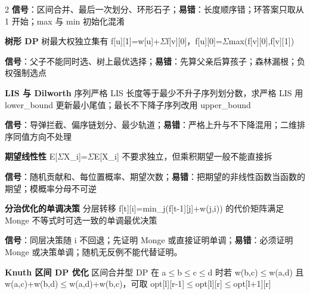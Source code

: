 \documentclass[UTF8,fontset=fandol,a4paper,twoside]{ctexart}
\begin{document}
\begin{multicols}{2}
\textbf{信号}：区间合并、最后一次划分、环形石子；\textbf{易错}：长度顺序错；环答案只取从 1 开始；max 与 min 初始化混淆\par
\par\textbf{树形 DP}\quad
树最大权独立集有 f[\allowbreak{}u]\allowbreak{}[\allowbreak{}1]\allowbreak{}=\allowbreak{}w[\allowbreak{}u]\allowbreak{}+\allowbreak{}\ensuremath{\Sigma}f[\allowbreak{}v]\allowbreak{}[\allowbreak{}0]\allowbreak{}，f[\allowbreak{}u]\allowbreak{}[\allowbreak{}0]\allowbreak{}=\allowbreak{}\ensuremath{\Sigma}max(\allowbreak{}f[\allowbreak{}v]\allowbreak{}[\allowbreak{}0]\allowbreak{},\allowbreak{}f[\allowbreak{}v]\allowbreak{}[\allowbreak{}1]\allowbreak{})\allowbreak{}\par
\textbf{信号}：父子不能同时选、树上最优选择；\textbf{易错}：先算父亲后算孩子；森林漏根；负权强制选点\par
\par\textbf{LIS 与 Dilworth}\quad
序列严格 LIS 长度等于最少不升子序列划分数，求严格 LIS 用 lower\_bound 更新最小尾值；最长不下降子序列改用 upper\_bound\par
\textbf{信号}：导弹拦截、偏序链划分、最少轨道；\textbf{易错}：严格上升与不下降混用；二维排序同值方向不处理\par
\par\textbf{期望线性性}\quad
E[\allowbreak{}\ensuremath{\Sigma}X\_i]\allowbreak{}=\allowbreak{}\ensuremath{\Sigma}E[\allowbreak{}X\_i]\allowbreak{} 不要求独立，但乘积期望一般不能直接拆\par
\textbf{信号}：随机贡献和、每位置概率、期望次数；\textbf{易错}：把期望的非线性函数当函数的期望；模概率分母不可逆\par
\par\textbf{分治优化的单调决策}\quad
分层转移 f[\allowbreak{}t]\allowbreak{}[\allowbreak{}i]\allowbreak{}=\allowbreak{}min\_j(\allowbreak{}f[\allowbreak{}t-\allowbreak{}1]\allowbreak{}[\allowbreak{}j]\allowbreak{}+\allowbreak{}w(\allowbreak{}j,\allowbreak{}i)\allowbreak{})\allowbreak{} 的代价矩阵满足 Monge 不等式时可选一致的单调最优决策\par
\textbf{信号}：同层决策随 i 不回退；先证明 Monge 或直接证明单调；\textbf{易错}：必须证明 Monge 或决策单调；随机无反例不能代替证明。\par
\par\textbf{Knuth 区间 DP 优化}\quad
区间合并型 DP 在 a\ensuremath{\le}b\ensuremath{\le}c\ensuremath{\le}d 时若 w(\allowbreak{}b,\allowbreak{}c)\allowbreak{}\ensuremath{\le}w(\allowbreak{}a,\allowbreak{}d)\allowbreak{} 且 w(\allowbreak{}a,\allowbreak{}c)\allowbreak{}+\allowbreak{}w(\allowbreak{}b,\allowbreak{}d)\allowbreak{}\ensuremath{\le}w(\allowbreak{}a,\allowbreak{}d)\allowbreak{}+\allowbreak{}w(\allowbreak{}b,\allowbreak{}c)\allowbreak{}，可取 opt[\allowbreak{}l]\allowbreak{}[\allowbreak{}r-\allowbreak{}1]\allowbreak{}\ensuremath{\le}opt[\allowbreak{}l]\allowbreak{}[\allowbreak{}r]\allowbreak{}\ensuremath{\le}opt[\allowbreak{}l+\allowbreak{}1]\allowbreak{}[\allowbreak{}r]\allowbreak{}\par

\end{multicols}
\end{document}
